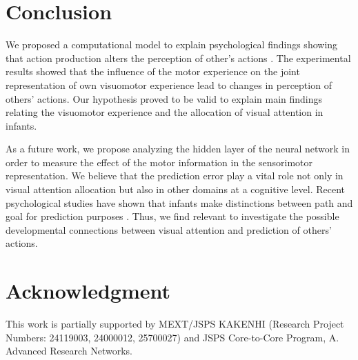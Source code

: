 \documentclass[conference]{IEEEtran}
\begin{document}
\section{Conclusion}
We proposed a computational model to explain psychological findings showing that action production alters the perception of other's actions \cite{sommerville2005action}. The experimental results showed that the influence of the motor experience on the joint representation of own visuomotor experience lead to changes in perception of others' actions. Our hypothesis proved to be valid to explain main findings relating the visuomotor experience and the allocation of visual attention in infants.

As a future work, we propose analyzing the hidden layer of the neural network in order to measure the effect of the motor information in the sensorimotor representation. We believe that the prediction error play a vital role not only in visual attention allocation but also in other domains at a cognitive level. Recent psychological studies have shown that infants make distinctions between path and goal for prediction purposes \cite{cannon2012infants}. Thus, we find relevant to investigate the possible developmental connections between visual attention and prediction of others' actions.


\section*{Acknowledgment}
This work is partially supported by MEXT/JSPS KAKENHI (Research Project Numbers: 24119003, 24000012, 25700027) and JSPS Core-to-Core Program, A. Advanced Research Networks.



\baselineskip 3.95mm

%
%
\end{document}
